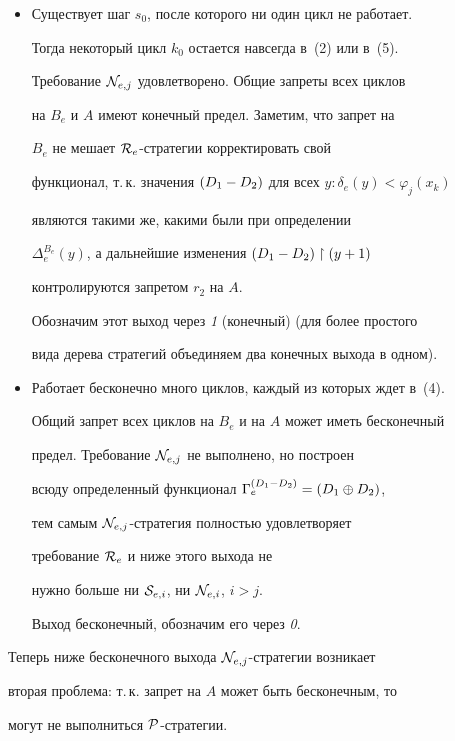\begin{itemize}


\item[1)] Существует шаг $s_0$, после которого ни один цикл не работает.


Тогда некоторый цикл $k_0$ остается навсегда в~(2) или в~(5).


Требование ${\cal N}_{e,j}$ удовлетворено. Общие запреты всех циклов


на $B_e$ и $A$ имеют конечный предел. Заметим, что запрет на


$B_e$ не мешает ${\cal R}_e$-стратегии корректировать свой


функционал, т.\,к. значения $\draz$ для всех $y:\delta_e(y)<\varphi_j(x_k)$


являются такими же, какими были при определении


$\Delta_e^{B_e}(y)$, а дальнейшие изменения $\draz\rst(y+1)$


контролируются запретом $r_2$ на $A$.


Обозначим этот выход через {\it 1} (конечный) (для более простого


вида дерева стратегий объединяем два конечных выхода в одном).


\item[2)] Работает бесконечно много циклов, каждый из которых ждет в~(4).


Общий запрет всех циклов на $B_e$ и на $A$ может иметь бесконечный


предел. Требование ${\cal N}_{e,j}$ не выполнено, но построен


всюду определенный функционал $\Gamma_e^{\draz}=\dsum$,


тем самым ${\cal N}_{e,j}$-стратегия полностью удовлетворяет


требование ${\cal R}_e$ и ниже этого выхода не


нужно больше ни ${\cal S}_{e,i}$, ни ${\cal N}_{e,i}$, $i>j$.


Выход бесконечный, обозначим его через {\it 0}.


\end{itemize}





Теперь ниже бесконечного выхода ${\cal N}_{e,j}$-стратегии возникает


вторая проблема: т.\,к. запрет на $A$ может быть бесконечным, то


могут не выполниться ${\cal P}$-стратегии.






